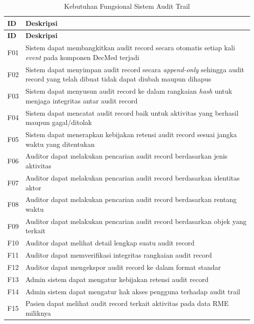 \begin{xltabular}{\textwidth}{|>{\centering\arraybackslash}p{1.3cm}|X|}
    \caption{Kebutuhan Fungsional Sistem Audit Trail} \\
    \hline
    \textbf{ID} & \textbf{Deskripsi} \\
    \hline
    \endfirsthead
    \hline
    \textbf{ID} & \textbf{Deskripsi} \\
    \hline
    \endhead
    \hline
    \endfoot
    \hline
    \endlastfoot

    F01 & Sistem dapat membangkitkan audit record secara otomatis setiap kali \textit{event} pada komponen DecMed terjadi \\
    \hline
    F02 & Sistem dapat menyimpan audit record secara \textit{append-only} sehingga audit record yang telah dibuat tidak dapat diubah maupun dihapus \\
    \hline
    F03 & Sistem dapat menyusun audit record ke dalam rangkaian \textit{hash} untuk menjaga integritas antar audit record \\
    \hline
    F04 & Sistem dapat mencatat audit record baik untuk aktivitas yang berhasil maupun gagal/ditolak \\
    \hline
    F05 & Sistem dapat menerapkan kebijakan retensi audit record sesuai jangka waktu yang ditentukan \\
    \hline
    F06 & Auditor dapat melakukan pencarian audit record berdasarkan jenis aktivitas \\
    \hline
    F07 & Auditor dapat melakukan pencarian audit record berdasarkan identitas aktor \\
    \hline
    F08 & Auditor dapat melakukan pencarian audit record berdasarkan rentang waktu \\
    \hline
    F09 & Auditor dapat melakukan pencarian audit record berdasarkan objek yang terkait \\
    \hline
    F10 & Auditor dapat melihat detail lengkap suatu audit record \\
    \hline
    F11 & Auditor dapat memverifikasi integritas rangkaian audit record \\
    \hline
    F12 & Auditor dapat mengekspor audit record ke dalam format standar \\
    \hline
    F13 & Admin sistem dapat mengatur kebijakan retensi audit record \\
    \hline
    F14 & Admin sistem dapat mengatur hak akses pengguna terhadap audit trail \\
    \hline
    F15 & Pasien dapat melihat audit record terkait aktivitas pada data RME miliknya \\

\end{xltabular}
